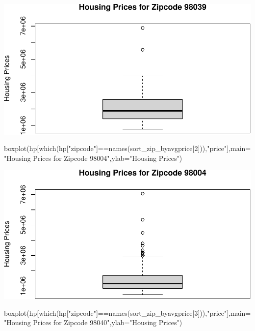 \documentclass[
]{article}
\newenvironment{Shaded}{\begin{snugshade}}{\end{snugshade}}
\newcommand{\AttributeTok}[1]{\textcolor[rgb]{0.77,0.63,0.00}{#1}}
\newcommand{\DecValTok}[1]{\textcolor[rgb]{0.00,0.00,0.81}{#1}}
\newcommand{\FunctionTok}[1]{\textcolor[rgb]{0.00,0.00,0.00}{#1}}
\newcommand{\NormalTok}[1]{#1}
\newcommand{\SpecialCharTok}[1]{\textcolor[rgb]{0.00,0.00,0.00}{#1}}
\newcommand{\StringTok}[1]{\textcolor[rgb]{0.31,0.60,0.02}{#1}}
\begin{document}
\includegraphics{HW2_Wu-Yulun_files/figure-latex/unnamed-chunk-1-1.pdf}

\begin{Shaded}
\begin{Highlighting}[]
\FunctionTok{boxplot}\NormalTok{(hp[}\FunctionTok{which}\NormalTok{(hp[}\StringTok{"zipcode"}\NormalTok{]}\SpecialCharTok{==}\FunctionTok{names}\NormalTok{(sort\_zip\_byavgprice[}\DecValTok{2}\NormalTok{])),}\StringTok{"price"}\NormalTok{],}\AttributeTok{main=}\StringTok{"Housing Prices for Zipcode 98004"}\NormalTok{,}\AttributeTok{ylab=}\StringTok{"Housing Prices"}\NormalTok{)}
\end{Highlighting}
\end{Shaded}

\includegraphics{HW2_Wu-Yulun_files/figure-latex/unnamed-chunk-1-2.pdf}

\begin{Shaded}
\begin{Highlighting}[]
\FunctionTok{boxplot}\NormalTok{(hp[}\FunctionTok{which}\NormalTok{(hp[}\StringTok{"zipcode"}\NormalTok{]}\SpecialCharTok{==}\FunctionTok{names}\NormalTok{(sort\_zip\_byavgprice[}\DecValTok{3}\NormalTok{])),}\StringTok{"price"}\NormalTok{],}\AttributeTok{main=}\StringTok{"Housing Prices for Zipcode 98040"}\NormalTok{,}\AttributeTok{ylab=}\StringTok{"Housing Prices"}\NormalTok{)}
\end{Highlighting}
\end{Shaded}
\end{document}
